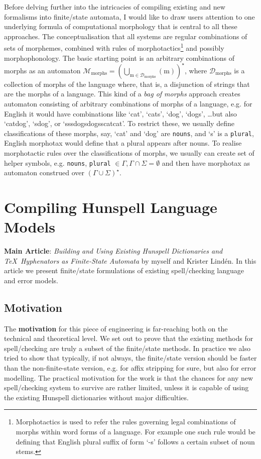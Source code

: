 \documentclass[officiallayout,final]{unihelcompling}
\begin{document}
Before delving further into the intricacies of compiling existing and new
formalisms into finite\-/state automata, I would like to draw users attention
to one underlying formula of computational morphology that is central to all
these approaches. The conceptualisation that all systems are regular
combinations of sets of morphemes, combined with rules of
\gls{morphotactics}\footnote{Morphotactics is used to refer the rules
    governing legal combinations of morphs within word forms of a language. For
example one such rule would be defining that English plural suffix of form `-s'
follows a certain subset of noun stems.} and possibly morphophonology.  The
basic starting point is an arbitrary combinations of morphs as an automaton
$\mathcal{M}_{\mathrm{morphs}} = (\bigcup_{\mathrm{m \in
{\mathcal{D}_\mathrm{morphs}}}} ({\mathrm{m}}))^\star$, where
$\mathcal{D}_\mathrm{morphs}$ is a collection of morphs of the language where,
that is, a disjunction of strings that are
the morphs of a language.  This kind of a \emph{bag of morphs} approach
creates automaton consisting of arbitrary combinations of morphs of a language,
e.g. for English it would have combinations like `cat', `cats', `dog', `dogs',
\ldots but also `catdog', `sdog', or `sssdogsdogsscatcat'. To restrict these,
we usually define classifications of these morphs, say, `cat' and `dog' are
\texttt{nouns}, and `s' is a \texttt{plural}, English morphotax would define
that a plural appears after nouns. To realise morphotactic rules over the
classifications of morphs, we usually can create set of helper symbols, e.g.
{\texttt{nouns}, \texttt{plural}} $\in \Gamma, \Gamma \cap \Sigma = \emptyset$
and then have morphotax as automaton construed over $(\Gamma \cup
\Sigma)^\star$.

\section{Compiling Hunspell Language Models}
\label{sec:Hunspell}

\textbf{Main Article}: \emph{Building and Using Existing Hunspell Dictionaries
and \TeX\ Hyphenators as Finite-State Automata} by myself and Krister Lindén.
In this article we present finite\-/state formulations of existing spell\-/checking
language and error models.

\subsection{Motivation}

The \textbf{motivation} for this piece of engineering is far-reaching both on
the technical and theoretical level. We set out to prove that the existing
methods for spell\-/checking are truly a subset of the finite\-/state methods.
In practice we also tried to show that typically, if not always, the
finite\-/state version should be faster than the non-finite-state version, e.g.
for affix stripping for sure, but also for error modelling. The practical
motivation for the work is that the chances for any new spell\-/checking system
to survive are rather limited, unless it is capable of using the existing
Hunspell dictionaries without major difficulties.
\end{document}
